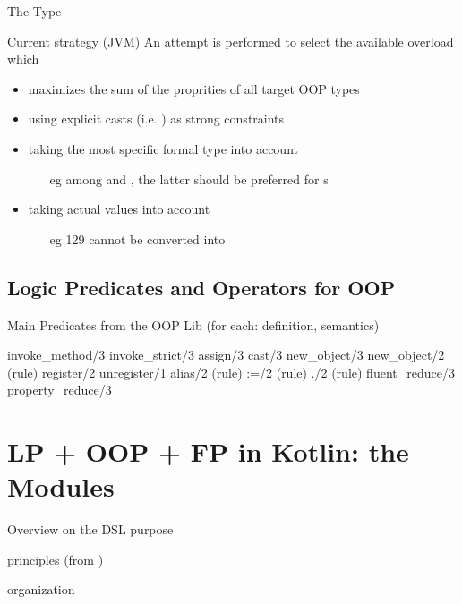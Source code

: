 \documentclass[handout]{beamer}
\begin{document}
\begin{frame}[allowframebreaks]{The  Type}
    \begin{exampleblock}{Current strategy (JVM)}
        An attempt is performed to select the available overload which
        \begin{itemize}
            \item maximizes the sum of the proprities of all target OOP types
            \item using explicit casts (i.e. ) as \alert{strong} constraints
            \item taking the most specific formal type into account
            \begin{itemize}
                \item[eg] among  and , the latter should be preferred for s
            \end{itemize}
            \item taking actual values into account
            \begin{itemize}
                \item[eg] 129 cannot be converted into 
            \end{itemize}
        \end{itemize}
    \end{exampleblock}
\end{frame}

\subsection{Logic Predicates and Operators for OOP}

\begin{frame}[allowframebreaks]{Main Predicates from the OOP Lib}
    (for each: definition, semantics)

    \ttfamily
    invoke\_method/3
    invoke\_strict/3
    assign/3
    cast/3
    new\_object/3
    new\_object/2 (rule)
    register/2
    unregister/1
    alias/2 (rule)
    :=/2 (rule)
    ./2 (rule)
    fluent\_reduce/3
    property\_reduce/3
\end{frame}

\section{LP + OOP + FP in Kotlin: the  Modules}

\begin{frame}[allowframebreaks]{Overview on the DSL}
    purpose

    principles (from \cite{kotlinDSl4PrologWoa2020})

    organization
\end{frame}
\end{document}
